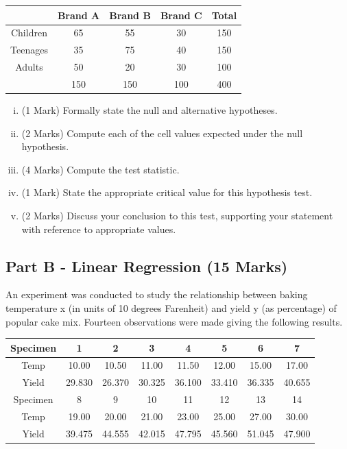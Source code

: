 \documentclass[a4paper,12pt]{article}
\begin{document}
{
\begin{center}
\begin{tabular}{|c||c|c|c||c|} \hline
	&	Brand A	&	Brand B	&	Brand C	&	Total	\\ \hline		\hline
	Children	&	65	&	55	&	30	&	150	\\ \hline	
	Teenages	&	35	&	75	&	40	&	150	\\ \hline	
	Adults	&	50	&	20	&	30	&	100	\\ \hline	\hline
	&	150	&	150	&	100	&	400	\\ \hline	 
\end{tabular} 
\end{center}
}
\begin{enumerate}[(i)]
	\item (1 Mark) Formally state the null and alternative hypotheses.
	\item (2 Marks) Compute each of the cell values expected under the null hypothesis. 
	\item (4 Marks) Compute the test statistic.
	\item (1 Mark) State the appropriate critical value for this hypothesis test.
	\item (2 Marks) Discuss your conclusion to this test, supporting your statement with reference to appropriate values.
\end{enumerate}




\subsection*{Part B - Linear Regression (15 Marks)}

An experiment was conducted to study the relationship between baking temperature x (in units of 10 degrees Farenheit) and yield y (as percentage) of popular cake mix. Fourteen observations were made giving the following results.





\begin{center}
\begin{tabular}{|c||c|c|c|c|c|c|c|}
\hline
Specimen & 1 & 2 & 3 & 4 & 5 & 6 & 7 \\ \hline
\hline
Temp &  10.00 & 10.50 & 11.00 & 11.50 & 12.00 & 15.00 & 17.00 \\ \hline 
Yield &  29.830&  26.370 & 30.325 &36.100 &33.410 &36.335 & 40.655 \\ \hline 
\hline\hline
Specimen & 8 & 9 & 10 & 11 & 12 & 13 & 14 \\  \hline
Temp &  19.00 & 20.00 & 21.00 & 23.00 & 25.00 & 27.00 & 30.00 \\ \hline
Yield &  39.475& 44.555&  42.015 & 47.795 & 45.560&  51.045 & 47.900 \\ \hline 
\hline
\end{tabular}
\end{center}
\end{document}
